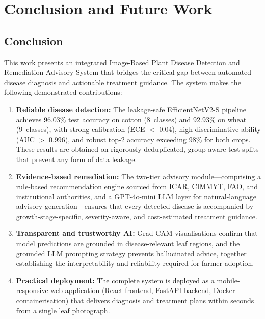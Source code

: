 \documentclass[12pt,a4paper]{report}
\begin{document}
\chapter{Conclusion and Future Work}

\section{Conclusion}
This work presents an integrated Image-Based Plant Disease Detection and Remediation Advisory System that bridges the critical gap between automated disease diagnosis and actionable treatment guidance. The system makes the following demonstrated contributions:

\begin{enumerate}
    \item \textbf{Reliable disease detection:} The leakage-safe EfficientNetV2-S pipeline achieves 96.03\% test accuracy on cotton (8~classes) and 92.93\% on wheat (9~classes), with strong calibration (ECE $<$ 0.04), high discriminative ability (AUC $>$ 0.996), and robust top-2 accuracy exceeding 98\% for both crops. These results are obtained on rigorously deduplicated, group-aware test splits that prevent any form of data leakage.

    \item \textbf{Evidence-based remediation:} The two-tier advisory module---comprising a rule-based recommendation engine sourced from ICAR, CIMMYT, FAO, and institutional authorities, and a GPT-4o-mini LLM layer for natural-language advisory generation---ensures that every detected disease is accompanied by growth-stage-specific, severity-aware, and cost-estimated treatment guidance.

    \item \textbf{Transparent and trustworthy AI:} Grad-CAM visualisations confirm that model predictions are grounded in disease-relevant leaf regions, and the grounded LLM prompting strategy prevents hallucinated advice, together establishing the interpretability and reliability required for farmer adoption.

    \item \textbf{Practical deployment:} The complete system is deployed as a mobile-responsive web application (React frontend, FastAPI backend, Docker containerisation) that delivers diagnosis and treatment plans within seconds from a single leaf photograph.
\end{enumerate}
\end{document}
